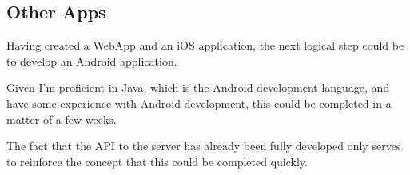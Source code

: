 \documentclass[12pt]{article}
\begin{document}
\subsection{Other Apps}

Having created a WebApp and an iOS application, the next logical step could be to develop an Android application. 

Given I'm proficient in Java, which is the Android development language, and have some experience with Android development, this could be completed in a matter of a few weeks. 

The fact that the API to the server has already been fully developed only serves to reinforce the concept that this could be completed quickly. 


\newpage



\newpage
\end{document}
